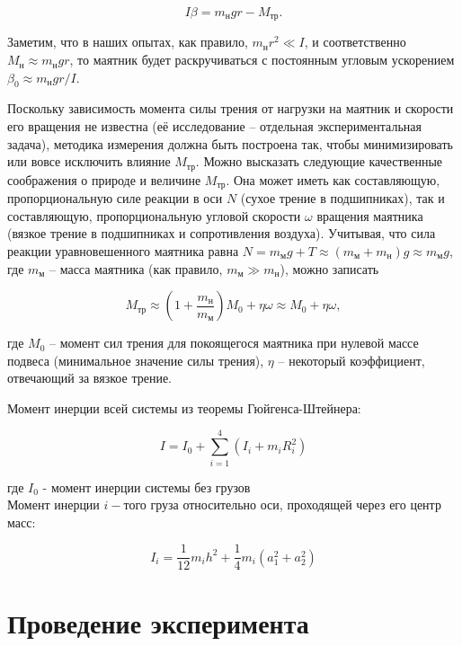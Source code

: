 \documentclass[12pt,a4paper]{scrartcl}
\begin{document}
	\begin{equation}
		I\beta = m_{\text{н}}gr - {M_{тр}}.
	\end{equation}

	Заметим, что в наших опытах, как правило, $m_{\text{н}}r^2 \ll I$, и соответственно $M_{\text{н}} \approx m_{\text{н}}gr$, то маятник будет раскручиваться с постоянным угловым ускорением $\beta _0 \approx m_{\text{н}}gr / I$.
	
	Поскольку зависимость момента силы трения от нагрузки на маятник и скорости его вращения не известна (её исследование -- отдельная экспериментальная задача), методика измерения должна быть построена так, чтобы минимизировать или вовсе исключить влияние $M_{тр}$. Можно высказать следующие качественные соображения о природе и величине $M_{тр}$. Она может иметь как составляющую, пропорциональную силе реакции в оси $N$ (сухое трение в подшипниках),  так и составляющую, пропорциональную угловой скорости $\omega$ вращения маятника (вязкое трение в подшипниках и сопротивления воздуха). Учитывая, что сила реакции уравновешенного маятника равна $N = m_{\text{м}}g + T \approx (m_{\text{м}} + m_{\text{н}})g \approx m_{\text{м}}g $, где $m_{\text{м}}$ -- масса маятника (как правило, $m_{\text{м}} \gg m_{\text{н}}$), можно записать
	
	\begin{equation}
		M_{тр} \approx \left(1 + \frac{m_{\text{н}}}{m_{\text{м}}}\right)M_0 + \eta\omega \approx M_0 + \eta\omega,
	\end{equation}

	где $M_0$ -- момент сил трения для покоящегося маятника при нулевой массе подвеса (минимальное значение силы трения), $\eta$ -- некоторый коэффициент, отвечающий за вязкое трение.
	
	Момент инерции всей системы из теоремы Гюйгенса-Штейнера:
	
	\begin{equation}\label{5}
		I = I_0 + \sum\limits_{i = 1}^4{(I_i + m_i R_i^2)}
	\end{equation}

	где $I_0$ - момент инерции системы без грузов\\
	Момент инерции $i-$того груза относительно оси, проходящей через его центр масс:
	
	\begin{equation}
		I_i = \dfrac{1}{12}m_i h^2 + \dfrac{1}{4}m_i(a_1^2 + a_2^2)    
	\end{equation}

	\section{Проведение эксперимента}
	
\end{document}
